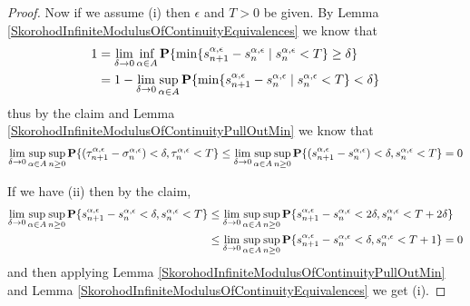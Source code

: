 \begin{proof}
Now if we assume (i) then $\epsilon$ and $T > 0$ be given.  By Lemma \ref{SkorohodInfiniteModulusOfContinuityEquivalences} we know that 
\begin{align*}
1 &= \lim_{\delta \to 0} \inf_{\alpha \in A} \textbf{P}\{\min \lbrace s^{\alpha, \epsilon}_{n+1} - s^{\alpha, \epsilon}_n \mid s^{\alpha, \epsilon}_n < T \rbrace \geq \delta\} \\
&=1 - \lim_{\delta \to 0} \sup_{\alpha \in A} \textbf{P}\{\min \lbrace s^{\alpha, \epsilon}_{n+1} - s^{\alpha, \epsilon}_n \mid s^{\alpha, \epsilon}_n < T \rbrace < \delta\} 
\end{align*}
thus by the claim and Lemma \ref{SkorohodInfiniteModulusOfContinuityPullOutMin} we know that 
\begin{align*}
\lim_{\delta \to 0} \sup_{\alpha \in A} \sup_{n \geq 0} \textbf{P}\{(\tau^{\alpha, \epsilon}_{n+1} - \sigma^{\alpha, \epsilon}_n) < \delta , \tau^{\alpha, \epsilon}_n < T\} 
&\leq \lim_{\delta \to 0} \sup_{\alpha \in A} \sup_{n \geq 0} \textbf{P}\{(s^{\alpha, \epsilon}_{n+1} - s^{\alpha, \epsilon}_n) < \delta , s^{\alpha, \epsilon}_n < T\} = 0\\
\end{align*}

If we have (ii) then by the claim,
\begin{align*}
\lim_{\delta \to 0} \sup_{\alpha \in A} \sup_{n \geq 0} \textbf{P}\{ s^{\alpha, \epsilon}_{n+1} - s^{\alpha, \epsilon}_n < \delta, s^{\alpha, \epsilon}_n < T \} 
&\leq \lim_{\delta \to 0} \sup_{\alpha \in A} \sup_{n \geq 0} \textbf{P}\{ s^{\alpha, \epsilon}_{n+1} - s^{\alpha, \epsilon}_n < 2 \delta, s^{\alpha, \epsilon}_n < T + 2\delta\}  \\
&\leq \lim_{\delta \to 0} \sup_{\alpha \in A} \sup_{n \geq 0} \textbf{P}\{ s^{\alpha, \epsilon}_{n+1} - s^{\alpha, \epsilon}_n < \delta, s^{\alpha, \epsilon}_n < T +1 \} =0 \\
\end{align*}
and then applying Lemma \ref{SkorohodInfiniteModulusOfContinuityPullOutMin} and  Lemma \ref{SkorohodInfiniteModulusOfContinuityEquivalences}  we get (i).
\end{proof}

